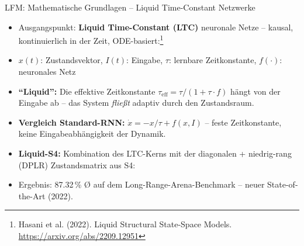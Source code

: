 \documentclass[aspectratio=1610, xcolor=dvipsnames, 9pt]{beamer}
\begin{document}
\begin{frame}{LFM: Mathematische Grundlagen -- Liquid Time-Constant Netzwerke}
  \begin{itemize}
    \item Ausgangspunkt: \textbf{Liquid Time-Constant (LTC)} neuronale Netze -- kausal, kontinuierlich in der Zeit, ODE-basiert:\footnote{Hasani et al. (2022). Liquid Structural State-Space Models. \url{https://arxiv.org/abs/2209.12951}}
  \end{itemize}
  \vspace{-0.1cm}
  \begin{center}
  \end{center}
  \vspace{0.1cm}
  \begin{itemize}
    \item $x(t)$: Zustandsvektor, $I(t)$: Eingabe, $\tau$: lernbare Zeitkonstante, $f(\cdot)$: neuronales Netz
    \item \textbf{``Liquid'':} Die effektive Zeitkonstante $\tau_{\text{eff}} = \tau / (1 + \tau \cdot f)$ hängt von der Eingabe ab -- das System \emph{fließt} adaptiv durch den Zustandsraum.
    \item \textbf{Vergleich Standard-RNN:} $\dot{x} = -x/\tau + f(x,I)$ -- feste Zeitkonstante, keine Eingabeabhängigkeit der Dynamik.
    \item \textbf{Liquid-S4:} Kombination des LTC-Kerns mit der diagonalen + niedrig-rang (DPLR) Zustandsmatrix aus S4:
  \end{itemize}
  \vspace{-0.1cm}
  \begin{center}
  \end{center}
  \begin{itemize}
    \item Ergebnis: 87.32\,\% Ø auf dem Long-Range-Arena-Benchmark -- neuer State-of-the-Art (2022).
  \end{itemize}
\end{frame}
\end{document}
